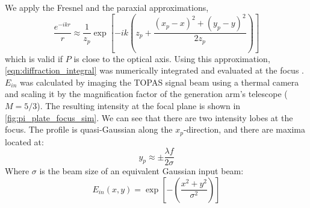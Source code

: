 We apply the Fresnel and the paraxial approximations,
\begin{equation}
\frac{e^{-i k r}}{r} \approx \frac{1}{z_p} \exp \left[-ik \left(z_p + \frac{(x_p-x)^2 + (y_p-y)^2}{2z_p} \right) \right]
\label{eqn:fresnel_paraxial_approx}
\end{equation}
which is valid if $P$ is close to the optical axis. Using this approximation, \cref{eqn:diffraction_integral} was numerically integrated and evaluated at the focus \cite{vdovinLightPipesPython}. $E_{in}$ was calculated by imaging the TOPAS signal beam using a thermal camera and scaling it by the magnification factor of the generation arm's telescope (${M=5/3}$). The resulting intensity at the focal plane is shown in \cref{fig:pi_plate_focus_sim}. We can see that there are two intensity lobes at the focus. The profile is quasi-Gaussian along the $x_p$-direction, and there are maxima located at:
\begin{equation}
y_p \approx \pm \frac{\lambda f}{2 \sigma}
\label{eqn:pi-plate-separation}
\end{equation}
Where $\sigma$ is the beam size of an equivalent Gaussian input beam:
\begin{equation}
E_{in}(x,y) = \exp \left[ - \left( \frac{x^2+y^2}{\sigma^2} \right) \right]
\label{eqn:gaussian_profile}
\end{equation}
%

